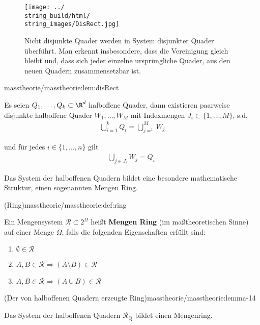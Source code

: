 \documentclass[letterpaper,10pt,english]{jupyterBook}
\begin{document}
\begin{figure}[htbp]
\centering


\noindent\texttt{[image: ../\\string\_build/html/\\string\_images/DisRect.jpg]}
\caption{Nicht disjunkte Quader werden in System disjunkter Quader überführt. Man erkennt insbesondere, dass die Vereinigung gleich bleibt und, dass sich jeder einzelne ursprüngliche Quader, aus den neuen Quadern zusammensetzbar ist.}\label{\detokenize{masstheorie/masstheorie:fig-disrect}}\end{figure}
\begin{lemma}{}{masstheorie/masstheorie:lem:disRect}



\par
Es seien \(Q_1,\ldots,Q_k\subset\R^d\) halboffene Quader, dann existieren paarweise disjunkte halboffene Quader \(W_1,\ldots, W_M\) mit Indexmengen \(J_i\subset\{1,\ldots,M\}\), s.d.
\begin{align*}
\bigcup_{i=1}^k Q_i = \bigcup_{j=^1}^M W_j
\end{align*}
\par
und für jedes \(i\in\{1,\ldots,n\}\) gilt
\begin{align*}
\bigcup_{j\in J_i} W_j = Q_i.
\end{align*}\end{lemma}

\par
Das System der halboffenen Quadern bildet eine besondere mathematische Struktur, einen sogenannten Mengen Ring.
\begin{definition}{(Ring)}{masstheorie/masstheorie:def:ring}



\par
Ein Mengensystem \(\mathcal{R} \subset 2^{\Omega}\) heißt \textbf{Mengen Ring} (im maßtheoretischen Sinne) auf einer Menge \(\Omega\), falls die folgenden Eigenschaften erfüllt sind:
\begin{enumerate}

\item {} 
\par
\(\emptyset \in \mathcal{R}\)

\item {} 
\par
\(A,B \in \mathcal{R} \Rightarrow (A \setminus B) \in \mathcal{R}\)

\item {} 
\par
\(A,B \in \mathcal{R} \Rightarrow (A \cup B) \in \mathcal{R}\)

\end{enumerate}
\end{definition}
\begin{lemma}{(Der von halboffenen Quadern erzeugte Ring)}{masstheorie/masstheorie:lemma-14}



\par
Das System der halboffenen Quadern \(\mathcal{R}_{\text{Q}}\) bildet einen Mengenring.
\end{lemma}
\end{document}
